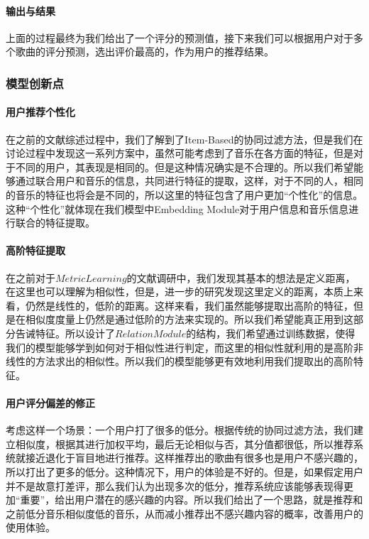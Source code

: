\paragraph{输出与结果}
上面的过程最终为我们给出了一个评分的预测值，接下来我们可以根据用户对于多个歌曲的评分预测，选出评价最高的，作为用户的推荐结果。

\subsubsection{模型创新点}
\paragraph{用户推荐个性化}
在之前的文献综述过程中，我们了解到了Item-Based的协同过滤方法，但是我们在讨论过程中发现这一系列方案中，虽然可能考虑到了音乐在各方面的特征，但是对于不同的用户，其表现是相同的。但是这种情况确实是不合理的。所以我们希望能够通过联合用户和音乐的信息，共同进行特征的提取，这样，对于不同的人，相同的音乐的特征也将会是不同的，所以这里的特征包含了用户更加“个性化”的信息。这种“个性化”就体现在我们模型中Embedding Module对于用户信息和音乐信息进行联合的特征提取。

\paragraph{高阶特征提取}
在之前对于$Metric Learning$的文献调研中，我们发现其基本的想法是定义距离，在这里也可以理解为相似性，但是，进一步的研究发现这里定义的距离，本质上来看，仍然是线性的，低阶的距离。这样来看，我们虽然能够提取出高阶的特征，但是在相似度度量上仍然是通过低阶的方法来实现的。所以我们希望能真正用到这部分告诫特征。所以设计了$Relation Module$的结构，我们希望通过训练数据，使得我们的模型能够学到如何对于相似性进行判定，而这里的相似性就利用的是高阶非线性的方法求出的相似性。所以我们的模型能够更有效地利用我们提取出的高阶特征。

\paragraph{用户评分偏差的修正}
考虑这样一个场景：一个用户打了很多的低分。根据传统的协同过滤方法，我们建立相似度，根据其进行加权平均，最后无论相似与否，其分值都很低，所以推荐系统就接近退化于盲目地进行推荐。这样推荐出的歌曲有很多也是用户不感兴趣的，所以打出了更多的低分。这种情况下，用户的体验是不好的。但是，如果假定用户并不是故意打差评，那么我们认为出现多次的低分，推荐系统应该能够表现得更加“重要”，给出用户潜在的感兴趣的内容。所以我们给出了一个思路，就是推荐和之前低分音乐相似度低的音乐，从而减小推荐出不感兴趣内容的概率，改善用户的使用体验。






